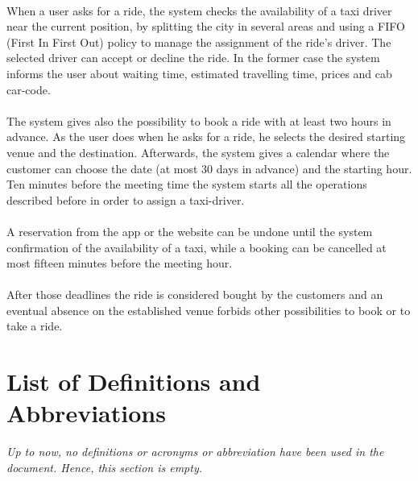 \documentclass[\mainpath/main]{subfiles}
\begin{document}
 \\
 When a user asks for a ride, the system checks the availability of a taxi driver near the current position, by splitting the city in several areas and using a FIFO (First In First Out) policy to manage the assignment of the ride's driver. The selected driver can accept or decline the ride. In the former case the system informs the user about waiting time, estimated travelling time, prices and cab car-code. \\
 \\
 The system gives also the possibility to book a ride with at least two hours in advance. As the user does when he asks for a ride, he selects the desired starting venue and the destination. Afterwards, the system gives a calendar where the customer can choose the date (at most 30 days in advance) and the starting hour. Ten minutes before the meeting time the system starts all the operations described before in order to assign a taxi-driver.\\
 \\
 A reservation from the app or the website can be undone until the system confirmation of the availability of a taxi, while a booking can be cancelled at most fifteen minutes before the meeting hour.\\
 \\
 After those deadlines the ride is considered bought by the customers and an eventual absence on the established venue forbids other possibilities to book or to take a ride.

\section{List of Definitions and Abbreviations}
\label{Introduction:DefinitionsAndAbbrevations}
\textit{Up to now, no definitions or acronyms or abbreviation have been used in the document. Hence, this section is empty.}
\end{document}
